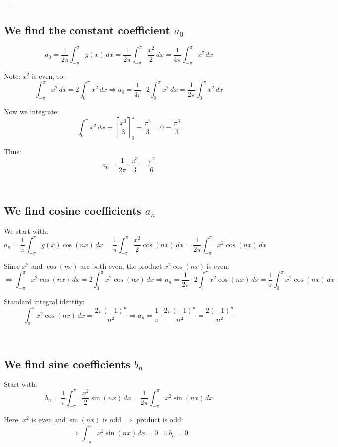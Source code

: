 \documentclass{article}
\begin{document}
---

\subsection*{We find the constant coefficient \( a_0 \)}

\[
a_0 = \frac{1}{2\pi} \int_{-\pi}^{\pi} g(x) \, dx = \frac{1}{2\pi} \int_{-\pi}^{\pi} \frac{x^2}{2} \, dx = \frac{1}{4\pi} \int_{-\pi}^{\pi} x^2 \, dx
\]

Note: \( x^2 \) is even, so:
\[
\int_{-\pi}^{\pi} x^2 \, dx = 2 \int_0^{\pi} x^2 \, dx
\Rightarrow a_0 = \frac{1}{4\pi} \cdot 2 \int_0^{\pi} x^2 \, dx = \frac{1}{2\pi} \int_0^{\pi} x^2 \, dx
\]

Now we integrate:
\[
\int_0^{\pi} x^2 \, dx = \left[ \frac{x^3}{3} \right]_0^{\pi} = \frac{\pi^3}{3} - 0 = \frac{\pi^3}{3}
\]

Thus:
\[
a_0 = \frac{1}{2\pi} \cdot \frac{\pi^3}{3} = \frac{\pi^2}{6}
\]

---

\subsection*{We find cosine coefficients \( a_n \)}

We start with:
\[
a_n = \frac{1}{\pi} \int_{-\pi}^{\pi} g(x) \cos(nx) \, dx = \frac{1}{\pi} \int_{-\pi}^{\pi} \frac{x^2}{2} \cos(nx) \, dx = \frac{1}{2\pi} \int_{-\pi}^{\pi} x^2 \cos(nx) \, dx
\]

Since \( x^2 \) and \( \cos(nx) \) are both even, the product \( x^2 \cos(nx) \) is even:
\[
\Rightarrow \int_{-\pi}^{\pi} x^2 \cos(nx) \, dx = 2 \int_0^{\pi} x^2 \cos(nx) \, dx
\Rightarrow a_n = \frac{1}{2\pi} \cdot 2 \int_0^{\pi} x^2 \cos(nx) \, dx = \frac{1}{\pi} \int_0^{\pi} x^2 \cos(nx) \, dx
\]

Standard integral identity:
\[
\int_0^{\pi} x^2 \cos(nx) \, dx = \frac{2\pi (-1)^n}{n^2}
\Rightarrow a_n = \frac{1}{\pi} \cdot \frac{2\pi (-1)^n}{n^2} = \frac{2(-1)^n}{n^2}
\]

---

\subsection*{We find sine coefficients \( b_n \)}

Start with:
\[
b_n = \frac{1}{\pi} \int_{-\pi}^{\pi} \frac{x^2}{2} \sin(nx) \, dx = \frac{1}{2\pi} \int_{-\pi}^{\pi} x^2 \sin(nx) \, dx
\]

Here, \( x^2 \) is even and \( \sin(nx) \) is odd \( \Rightarrow \) product is odd:
\[
\Rightarrow \int_{-\pi}^{\pi} x^2 \sin(nx) \, dx = 0 \Rightarrow b_n = 0
\]
\end{document}
